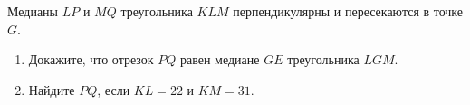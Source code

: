 \begin{ex}
	\begin{condition}
		Медианы \( LP  \) и \( MQ  \) треугольника \( KLM  \) перпендикулярны и	пересекаются в точке \( G \).
		\begin{enumerate}
			\item Докажите, что отрезок \( PQ  \) равен медиане \( GE  \) треугольника \( LGM \).
			\item Найдите \( PQ \), если \( KL=22  \) и \( KM =31 \).
		\end{enumerate}
	\end{condition}
\end{ex}